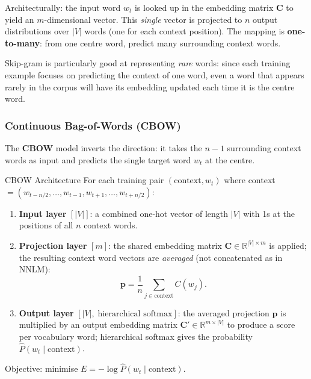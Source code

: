 \documentclass[11pt,a4paper]{article}
\newcommand{\term}[1]{\textcolor{DefGreen}{\textbf{#1}}\index{#1}}
\begin{document}
Architecturally: the input word $w_t$ is looked up in the embedding matrix $\mathbf{C}$ to yield an $m$-dimensional vector. This \emph{single} vector is projected to $n$ output distributions over $|V|$ words (one for each context position). The mapping is \textbf{one-to-many}: from one centre word, predict many surrounding context words.

Skip-gram is particularly good at representing \emph{rare} words: since each training example focuses on predicting the context of one word, even a word that appears rarely in the corpus will have its embedding updated each time it is the centre word.

\subsubsection{Continuous Bag-of-Words (CBOW)}

The \term{CBOW} model inverts the direction: it takes the $n-1$ surrounding context words as input and predicts the single target word $w_t$ at the centre.

\begin{thmbox}{CBOW Architecture}
For each training pair $(\text{context}, w_t)$ where context $= (w_{t-n/2}, \ldots, w_{t-1}, w_{t+1}, \ldots, w_{t+n/2})$:
\begin{enumerate}
  \item \textbf{Input layer} $[|V|]$: a combined one-hot vector of length $|V|$ with 1s at the positions of all $n$ context words.
  \item \textbf{Projection layer} $[m]$: the shared embedding matrix $\mathbf{C} \in \mathbb{R}^{|V| \times m}$ is applied; the resulting context word vectors are \emph{averaged} (not concatenated as in NNLM):
  \[
    \mathbf{p} = \frac{1}{n}\sum_{j \in \text{context}} C(w_j).
  \]
  \item \textbf{Output layer} $[|V|,\;\text{hierarchical softmax}]$: the averaged projection $\mathbf{p}$ is multiplied by an output embedding matrix $\mathbf{C}' \in \mathbb{R}^{m \times |V|}$ to produce a score per vocabulary word; hierarchical softmax gives the probability $\hat{P}(w_t \mid \text{context})$.
\end{enumerate}
Objective: minimise $E = -\log \hat{P}(w_t \mid \text{context})$.
\end{thmbox}
\end{document}
